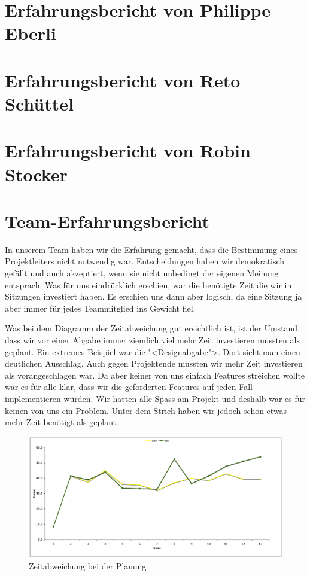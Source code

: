 \documentclass[12pt,halfparskip]{scrartcl}
\begin{document}
\section{Erfahrungsbericht von Philippe Eberli}

\section{Erfahrungsbericht von Reto Schüttel}

\section{Erfahrungsbericht von Robin Stocker}

\section{Team-Erfahrungsbericht}
In unserem Team haben wir die Erfahrung gemacht, dass die Bestimmung eines Projektleiters nicht notwendig war. Entscheidungen haben wir demokratisch gefällt und auch akzeptiert, wenn sie nicht unbedingt der eigenen Meinung entsprach. Was für uns eindrücklich erschien, war die benötigte Zeit die wir in Sitzungen investiert haben. Es erschien uns dann aber logisch, da eine Sitzung ja aber immer für jedes Teammitglied ins Gewicht fiel.

Was bei dem Diagramm der Zeitabweichung gut ersichtlich ist, ist der Umstand, dass wir vor einer Abgabe immer ziemlich viel mehr Zeit investieren mussten als geplant. Ein extremes Beispiel war die "<Designabgabe">. Dort sieht man einen deutlichen Ausschlag. Auch gegen Projektende mussten wir mehr Zeit investieren als vorangeschlagen war. Da aber keiner von uns einfach Features streichen wollte war es für alle klar, dass wir die geforderten Features auf jeden Fall implementieren würden. Wir hatten alle Spass am Projekt und deshalb war es für keinen von uns ein Problem. Unter dem Strich haben wir jedoch schon etwas mehr Zeit benötigt als geplant.

\begin{figure}[h]
	\centering
	\includegraphics[width=0.8 \textwidth]{zeitabweichung}
	\caption{Zeitabweichung bei der Planung}
	\label{fig:zeitabweichung}
\end{figure}
\end{document}
